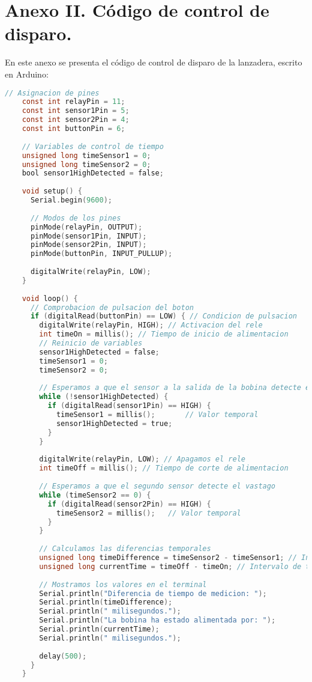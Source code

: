 \section*{Anexo II. Código de control de disparo.}

En este anexo se presenta el código de control de disparo de la lanzadera, escrito en Arduino:

\begin{lstlisting}[language=C, label={lst:arduino}]
    // Asignacion de pines
    const int relayPin = 11;
    const int sensor1Pin = 5;
    const int sensor2Pin = 4;
    const int buttonPin = 6;
    
    // Variables de control de tiempo
    unsigned long timeSensor1 = 0;
    unsigned long timeSensor2 = 0;
    bool sensor1HighDetected = false;
    
    void setup() {
      Serial.begin(9600);
    
      // Modos de los pines
      pinMode(relayPin, OUTPUT);
      pinMode(sensor1Pin, INPUT);
      pinMode(sensor2Pin, INPUT);
      pinMode(buttonPin, INPUT_PULLUP);
    
      digitalWrite(relayPin, LOW);
    }
    
    void loop() {
      // Comprobacion de pulsacion del boton
      if (digitalRead(buttonPin) == LOW) { // Condicion de pulsacion
        digitalWrite(relayPin, HIGH); // Activacion del rele
        int timeOn = millis(); // Tiempo de inicio de alimentacion
        // Reinicio de variables
        sensor1HighDetected = false;  
        timeSensor1 = 0;
        timeSensor2 = 0;
    
        // Esperamos a que el sensor a la salida de la bobina detecte el vastago
        while (!sensor1HighDetected) {
          if (digitalRead(sensor1Pin) == HIGH) {
            timeSensor1 = millis();       // Valor temporal
            sensor1HighDetected = true;
          }
        }
    
        digitalWrite(relayPin, LOW); // Apagamos el rele
        int timeOff = millis(); // Tiempo de corte de alimentacion
    
        // Esperamos a que el segundo sensor detecte el vastago
        while (timeSensor2 == 0) {
          if (digitalRead(sensor2Pin) == HIGH) {
            timeSensor2 = millis();   // Valor temporal
          }
        }
    
        // Calculamos las diferencias temporales
        unsigned long timeDifference = timeSensor2 - timeSensor1; // Intervalo de tiempo para la velocidad
        unsigned long currentTime = timeOff - timeOn; // Intervalo de tiempo de alimentacion
    
        // Mostramos los valores en el terminal
        Serial.println("Diferencia de tiempo de medicion: ");
        Serial.println(timeDifference);
        Serial.println(" milisegundos.");
        Serial.println("La bobina ha estado alimentada por: ");
        Serial.println(currentTime);
        Serial.println(" milisegundos.");
    
        delay(500);
      }
    }
    
\end{lstlisting}

